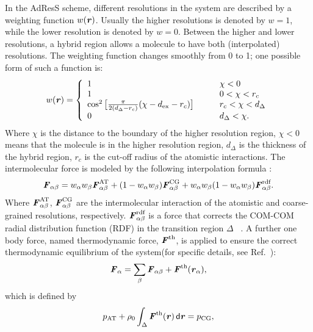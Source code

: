 \documentclass[aip,jcp,a4paper,reprint,onecolumn]{revtex4-1}
\newcommand{\vect}[1]{\textbf{\textit{#1}}}
\newcommand{\dd}[1]{\textsf{#1}}
\newcommand{\AT}{{\textrm{{AT}}}}
\newcommand{\CG}{{\textrm{CG}}}
\newcommand{\HY}{{\Delta}}
\newcommand{\rdf}{{\textrm{rdf}}}
\begin{document}
In the AdResS scheme,
different resolutions in the system are described by a weighting
function $w(\vect r)$. Usually the higher resolutions is
denoted by $w = 1$, while the lower resolution is denoted by $w = 0$.
Between the higher and lower resolutions, a hybrid region allows a 
molecule to have both (interpolated) resolutions. The weighting function changes smoothly
from 0 to 1; one possible form of such a function is:
\begin{align}\label{eqn:new-w}
  w(\vect r) =
  \left\{
    \begin{array}{lcl}
      1 &\quad& \chi < 0\\
      1  && 0 < \chi < r_c\\
      \cos^2\big[\frac{\pi}{2(d_{\HY} - r_c)} (\chi - d_{\textrm{ex}} - r_c)\big] && r_c < \chi < d_{\HY} \\
      0 &&  d_{\HY}  < \chi.
    \end{array}
  \right.
\end{align}
Where $\chi$ is the distance to the boundary of the higher resolution
region, $\chi < 0$ means that the molecule is in the higher resolution
region, $d_{\HY}$ is the thickness of the hybrid region, $r_c$ is the
cut-off radius of the atomistic interactions.  The intermolecular force is modeled by the following
interpolation formula \cite{rdfcorr}:
\begin{align}
  \vect F_{\alpha\beta} =
  w_\alpha w_\beta\vect F^{\AT}_{\alpha\beta} +
  (1-w_\alpha w_\beta)\vect F^{\CG}_{\alpha\beta} +
  w_\alpha w_\beta (1-w_\alpha w_\beta)\vect F_{\alpha\beta}^{\rdf}.
\label{grf}
\end{align}
Where $ \vect F^{\AT}_{\alpha\beta}$, $ \vect F^{\CG}_{\alpha\beta}$
are the intermolecular interaction of the atomistic and coarse-grained
resolutions, respectively.  $\vect F_{\alpha\beta}^{\rdf}$ is a force that corrects the COM-COM radial distribution function (RDF) in the transition region $\Delta$ ~\cite{rdfcorr}. A further one body force, named thermodynamic force, ${\vect F}^{\textrm{th}}$, is applied to ensure the correct thermodynamic equilibrium of the system(for specific details, see Ref.~\cite{prlgc}):
\begin{equation}
  {\vect F}_{\alpha}=
  \sum_{\beta}{\vect F}_{\alpha\beta}+
  {\vect F}^{\textrm{th}}(\vect r_\alpha),
\label{mody}
\end{equation}
which is defined by
\begin{equation}
  p_{\AT}+
  \rho_0
  \int_{\Delta} {\vect F}^\text{th}(\vect r)\,\dd d\vect r
  =p_{\CG},
  \label{thf}
\end{equation}
\end{document}
